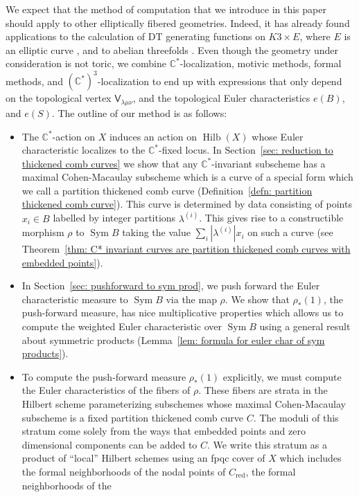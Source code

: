 \documentclass[12pt]{amsart}
\theoremstyle{definition}
\newcommand{\CC} {\mathbb{C}}          %
\newcommand{\sfV}{\mathsf{V}}
\newcommand{\Sym}{\operatorname{Sym}}
\newcommand{\Hilb}{\operatorname{Hilb}}
\newcommand{\red}{\mathrm{red}}
\begin{document}
We expect that the method of computation that we introduce in this
paper should apply to other elliptically fibered geometries. Indeed,
it has already found applications to the calculation of DT generating
functions on $K3 \times E$, where $E$ is an elliptic curve
\cite{Bryan-K3xE}, and to abelian threefolds \cite{BOPY}. Even though
the geometry under consideration is not toric, we combine
$\CC^*$-localization, motivic methods, formal methods, and
$(\CC^{*})^{3}$-localization to end up with expressions that only
depend on the topological vertex $\sfV_{\lambda\mu\nu}$, and the
topological Euler characteristics $e(B)$, and $e(S)$. The outline of
our method is as follows:
\begin{itemize}
\item The $\CC^{*}$-action on $X$ induces an action on $\Hilb (X)$
whose Euler characteristic localizes to the $\CC^{*}$-fixed locus.  In
Section~\ref{sec: reduction to thickened comb curves} we show that any
$\CC^{*}$-invariant subscheme has a maximal Cohen-Macaulay subscheme
which is a curve of a special form which we call a partition thickened
comb curve (Definition~\ref{defn: partition thickened comb
curve}). This curve is determined by data consisting of points
$x_{i}\in B$ labelled by integer partitions $\lambda^{(i)}$. This
gives rise to a constructible morphism $\rho$ to $\Sym B$ taking the
value $\sum_{i} |\lambda^{(i)}|x_{i}$ on such a curve (see
Theorem~\ref{thm: C* invariant curves are partition thickened comb
curves with embedded points}).
\item In Section~\ref{sec: pushforward to sym prod}, we push forward
the Euler characteristic measure to $\Sym B$ via the map $\rho$. We
show that $\rho_{*}(1)$, the push-forward measure, has nice
multiplicative properties which allows us to compute the weighted
Euler characteristic over $\Sym B$ using a general result about
symmetric products (Lemma~\ref{lem: formula for euler char of sym
products}). 
\item To compute the push-forward measure $\rho_{*}(1)$ explicitly, we
must compute the Euler characteristics of the fibers of $\rho$. These
fibers are strata in the Hilbert scheme parameterizing subschemes
whose maximal Cohen-Macaulay subscheme is a fixed partition thickened
comb curve $C$. The moduli of this stratum come solely from the ways
that embedded points and zero dimensional components can be added to
$C$. We write this stratum as a product of ``local'' Hilbert schemes
using an fpqc cover of $X$ which includes the formal neighborhoods of
the nodal points of $C_{\red}$, the formal neighborhoods of the

\end{itemize}
\end{document}
